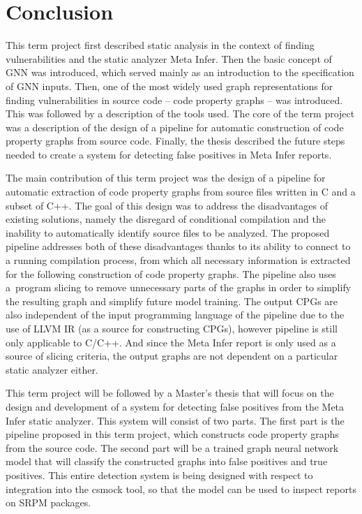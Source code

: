 \chapter{Conclusion}
This term project first described static analysis in the context of finding vulnerabilities and the static analyzer Meta Infer. Then the basic concept of GNN was introduced, which served mainly as an introduction to the specification of GNN inputs. Then, one of the most widely used graph representations for finding vulnerabilities in source code -- code property graphs -- was introduced. This was followed by a description of the tools used. The core of the term project was a description of the design of a pipeline for automatic construction of code property graphs from source code. Finally, the thesis described the future steps needed to create a system for detecting false positives in Meta Infer reports.

The main contribution of this term project was the design of a pipeline for automatic extraction of code property graphs from source files written in C and a subset of C++. The goal of this design was to address the disadvantages of existing solutions, namely the disregard of conditional compilation and the inability to automatically identify source files to be analyzed. The proposed pipeline addresses both of these disadvantages thanks to its ability to connect to a running compilation process, from which all necessary information is extracted for the following construction of code property graphs. The pipeline also uses a~program slicing to remove unnecessary parts of the graphs in order to simplify the resulting graph and simplify future model training. The output CPGs are also independent of the input programming language of the pipeline due to the use of LLVM IR (as a source for constructing CPGs), however pipeline is still only applicable to C/C++. And since the Meta Infer report is only used as a source of slicing criteria, the output graphs are not dependent on a particular static analyzer either.

This term project will be followed by a Master's thesis that will focus on the design and development of a system for detecting false positives from the Meta Infer static analyzer. This system will consist of two parts. The first part is the pipeline proposed in this term project, which constructs code property graphs from the source code. The second part will be a trained graph neural network model that will classify the constructed graphs into false positives and true positives. This entire detection system is being designed with respect to integration into the csmock tool, so that the model can be used to inspect reports on SRPM packages.
